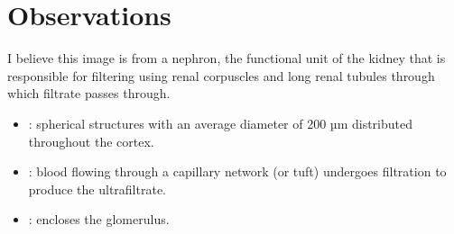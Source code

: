 \documentclass[basic]{inVerba-notes}
\begin{document}
\begin{center}
\end{center}

\section{Observations}
I believe this image is from a nephron, the functional unit of the kidney that is responsible for filtering using renal corpuscles and long renal tubules through which filtrate passes through.
\begin{itemize}
  
  \item {}: spherical structures
  with an average diameter of 200 µm
  distributed throughout the cortex.
  
  \begin{center}
  \end{center}

  \item {}: blood flowing through a capillary network (or tuft) undergoes filtration to produce the ultrafiltrate. 
  
  \begin{center}
  \end{center}

  \item {}: encloses the glomerulus.
  
  \begin{center}
  \end{center}
  
  
\end{itemize}
\end{document}
